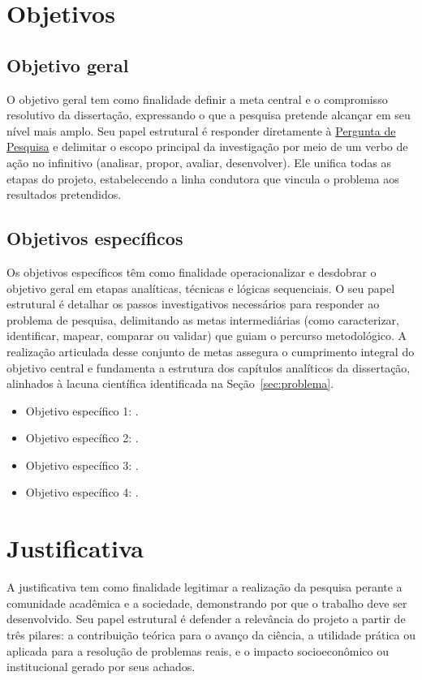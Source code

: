 \section{Objetivos}
\label{sec:objetivos}

\subsection{Objetivo geral}
\label{subsec:objetivo_geral}
O objetivo geral tem como finalidade definir a meta central e o compromisso resolutivo da dissertação, expressando o que a pesquisa pretende alcançar em seu nível mais amplo. Seu papel estrutural é responder diretamente à \hyperref[perg:principal]{Pergunta de Pesquisa} e delimitar o escopo principal da investigação por meio de um verbo de ação no infinitivo (analisar, propor, avaliar, desenvolver). Ele unifica todas as etapas do projeto, estabelecendo a linha condutora que vincula o problema aos resultados pretendidos.

\subsection{Objetivos específicos}
\label{subsec:objetivos_especificos}
Os objetivos específicos têm como finalidade operacionalizar e desdobrar o objetivo geral em etapas analíticas, técnicas e lógicas sequenciais. O seu papel estrutural é detalhar os passos investigativos necessários para responder ao problema de pesquisa, delimitando as metas intermediárias (como caracterizar, identificar, mapear, comparar ou validar) que guiam o percurso metodológico. A realização articulada desse conjunto de metas assegura o cumprimento integral do objetivo central e fundamenta a estrutura dos capítulos analíticos da dissertação, alinhados à lacuna científica identificada na Seção~\ref{sec:problema}.

\begin{itemize}
  \item Objetivo específico 1: .
  \item Objetivo específico 2: .
  \item Objetivo específico 3: .
  \item Objetivo específico 4: .
\end{itemize}

\section{Justificativa}
\label{sec:justificativa}
A justificativa tem como finalidade legitimar a realização da pesquisa perante a comunidade acadêmica e a sociedade, demonstrando por que o trabalho deve ser desenvolvido. Seu papel estrutural é defender a relevância do projeto a partir de três pilares: a contribuição teórica para o avanço da ciência, a utilidade prática ou aplicada para a resolução de problemas reais, e o impacto socioeconômico ou institucional gerado por seus achados.

